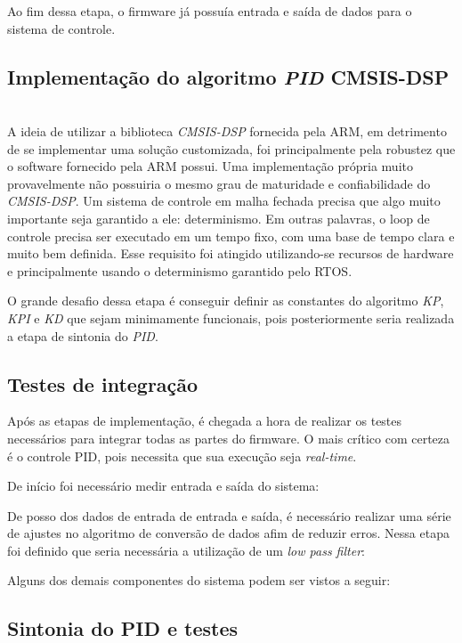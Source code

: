 \documentclass[times, twoside, watermark]{artigo}
\begin{document}
Ao fim dessa etapa, o firmware já possuía entrada e saída de dados para o sistema de controle.

\subsection{Implementação do algoritmo \textit{PID} CMSIS-DSP}\hfill\\
A ideia de utilizar a biblioteca \textit{CMSIS-DSP} fornecida pela ARM, em detrimento de se implementar uma solução customizada, foi principalmente pela robustez que o software fornecido pela ARM possui.
Uma implementação própria muito provavelmente não possuiria o mesmo grau de maturidade e confiabilidade do \textit{CMSIS-DSP}.
Um sistema de controle em malha fechada precisa que algo muito importante seja garantido a ele: determinismo. Em outras palavras, o loop de controle precisa ser executado em um tempo fixo, com uma base de tempo clara e muito bem definida. Esse requisito foi atingido utilizando-se recursos de hardware e principalmente usando o determinismo garantido pelo RTOS.

O grande desafio dessa etapa é conseguir definir as constantes do algoritmo \textit{KP}, \textit{KPI} e \textit{KD} que sejam minimamente funcionais, pois posteriormente seria realizada a etapa de sintonia do \textit{PID}.

\subsection{Testes de integração}
Após as etapas de implementação, é chegada a hora de realizar os testes necessários para integrar todas as partes do firmware.
O mais crítico com certeza é o controle PID, pois necessita que sua execução seja \textit{real-time}.

De início foi necessário medir entrada e saída do sistema:



De posso dos dados de entrada de entrada e saída, é necessário realizar uma série de ajustes no algoritmo de conversão de dados afim de reduzir erros.
Nessa etapa foi definido que seria necessária a utilização de um \textit{low pass filter}:


Alguns dos demais componentes do sistema podem ser vistos a seguir:


\subsection{Sintonia do PID e testes}
\end{document}
